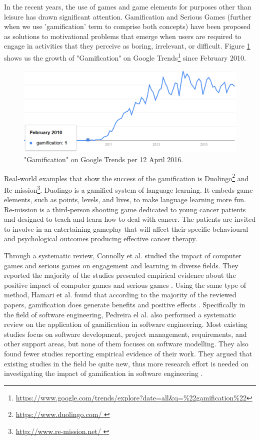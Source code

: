 \documentclass[12pt, a4paper]{report}
\begin{document}
In the recent years, the use of games and game elements for purposes other than leisure has drawn significant attention. Gamification \cite{deterding2011game} and Serious Games \cite{Michael2005} (further when we use 'gamification' term to comprise both concepts) have been proposed as solutions to motivational problems that emerge when users are required to engage in activities that they perceive as boring, irrelevant, or difficult. Figure \ref{gamification-trend} shows us the growth of "Gamification" on Google Trends\footnote{\url{https://www.google.com/trends/explore?date=all&q=\%22gamification\%22}} since February 2010. 

\begin{figure}[ht]
\centering
\includegraphics[width=12cm]{gamification-trend}
\caption{"Gamification" on Google Trends per 12 April 2016.}
\label{gamification-trend}
\end{figure}

Real-world examples that show the success of the gamification is Duolingo\footnote{\url{https://www.duolingo.com/
}} and Re-mission\footnote{\url{http://www.re-mission.net/
}}. Duolingo is a gamified system of language learning. It embeds game elements, such as points, levels, and lives, to make language learning more fun. Re-mission is a third-person shooting game dedicated to young cancer patients and designed to teach and learn how to deal with cancer. The patients are invited to involve in an entertaining gameplay that will affect their specific behavioural and psychological outcomes producing effective cancer therapy.
 
Through a systematic review, Connolly et al. studied the impact of computer games and serious games on engagement and learning in diverse fields. They reported the majority of the studies presented empirical evidence about the positive impact of computer games and serious games \cite{connolly2012systematic}. Using the same type of method, Hamari et al. found that according to the majority of the reviewed papers, gamification does generate benefits and positive effects \cite{hamari2014does}. Specifically in the field of software engineering, Pedreira el al. also performed a systematic review on the application of gamification in software engineering. Most existing studies focus on software development, project management, requirements, and other support areas, but none of them focuses on software modelling. They also found fewer studies reporting empirical evidence of their work. They argued that existing studies in the field be quite new, thus more research effort is needed on investigating the impact of gamiﬁcation in software engineering \cite{Pedreira2015}. 
\end{document}
